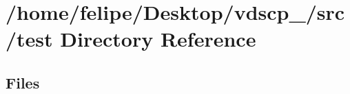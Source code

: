 \section{/home/felipe/\+Desktop/vdscp\+\_/src/test Directory Reference}
\label{dir_120ed4da3e3217b1e7fc0b4f48568e79}
\subsection*{Files}
\begin{DoxyCompactItemize}
\end{DoxyCompactItemize}
